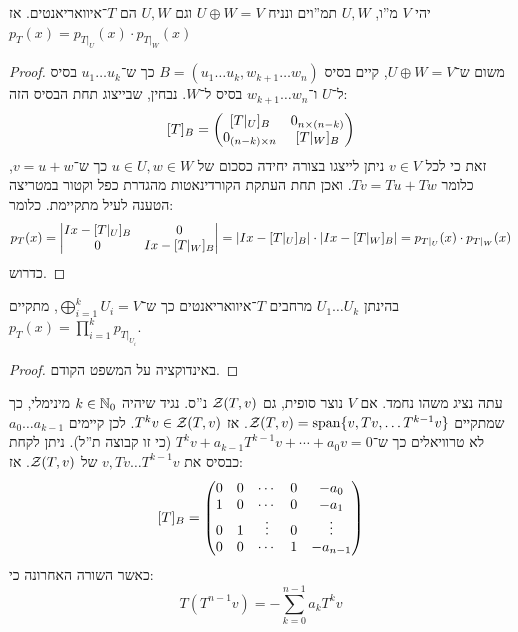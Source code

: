 \documentclass[name=רשימות אלגברה לינארית 2א]{../../../tex/classes/megasumPreamble}
\begin{document}
	\begin{Theorem}
		יהי $V$ מ''ו, $U, W$ תמ''וים ונניח $U \oplus W = V$ וגם $U, W$ הם $T$־איוואריאנטים. אז $p_T(x) = p_{T|_U}(x) \cdot p_{T|_W}(x)$
	\end{Theorem}
	\begin{proof}
		משום ש־$U \oplus W = V$, קיים בסיס $B = (u_1 \dots u_k, w_{k + 1} \dots w_n)$ כך ש־$u_1 \dots u_k$ בסיס ל־$U$ ו־$w_{k + 1} \dots w_{n}$ בסיס ל־$W$. נבחין, שבייצוג תחת הבסיס הזה: 
		\[ [T]_B = \begin{pmatrix} [T|_U]_B & 0_{n \times (n - k)} \\ 0_{(n - k) \times n} & [T|_W]_B \end{pmatrix} \]
		זאת כי לכל $v \in V$ ניתן לייצגו בצורה יחידה כסכום של $u \in U, w \in W$ כך ש־$v = u + w$, כלומר $Tv = Tu + Tw$. ואכן תחת העתקת הקורדינאטות מהגדרת כפל וקטור במטריצה הטענה לעיל מתקיימת. 
		כלומר: 
		\[ p_T(x) = \left \lvert \begin{matrix} Ix - [T|_U]_B & 0 \\ 0 & Ix - [T|_W]_B \end{matrix} \right \rvert = \left \lvert Ix - [T|_U]_B \right \rvert \cdot \left \lvert Ix - [T|_W]_B \right \rvert = p_{T|_U}(x) \cdot p_{T|_W}(x) \]
		כדרוש. 
	\end{proof}
	\begin{Theorem}
		בהינתן $U_1 \dots U_k$ מרחבים $T$־איוואריאנטים כך ש־$\bigoplus_{i = 1}^{k} U_i = V$, מתקיים $p_T(x) = \prod_{i = 1}^{k} p_{T|_{U_i}}$. 
	\end{Theorem}
	\begin{proof}
		באינדוקציה על המשפט הקודם. 
	\end{proof}
	
	
	עתה נציג משהו נחמד. אם $V$ נוצר סופית, גם $\mathcal{Z}(T, v)$ נ''ס. נגיד שיהיה $k \in \mathbb{N}_0$ מינימלי, כך שמתקיים $\mathcal{Z}(T, v) = \operatorname{span}\{v, Tv, \dots T^{k - 1} v\}$. אז $T^kv \in \mathcal{Z}(T, v)$. לכן קיימים $a_0 \dots a_{k - 1}$ לא טרוויאלים כך ש־$T^kv + a_{k - 1}T^{k - 1}v + \cdots + a_0v = 0$ (כי זו קבוצה ת''ל). ניתן לקחת כבסיס את $v, Tv \dots T^{k - 1} v$ של $\mathcal{Z}(T, v)$. אז: 
	\[ [T]_B = \begin{pmatrix} 0 & 0 & \cdots & 0 & -a_0
		\\ 1 & 0 & \cdots & 0&-a_1
		\\ 0 & 1 & \vdots & 0& \vdots
		\\ 0 & 0  & \cdots & 1 &-a_{n - 1} \end{pmatrix} \]
	כאשר השורה האחרונה כי: 
	\[ T(T^{n - 1}v)  = -\sum_{k = 0}^{n - 1}a_kT^kv \]
	
\end{document}
